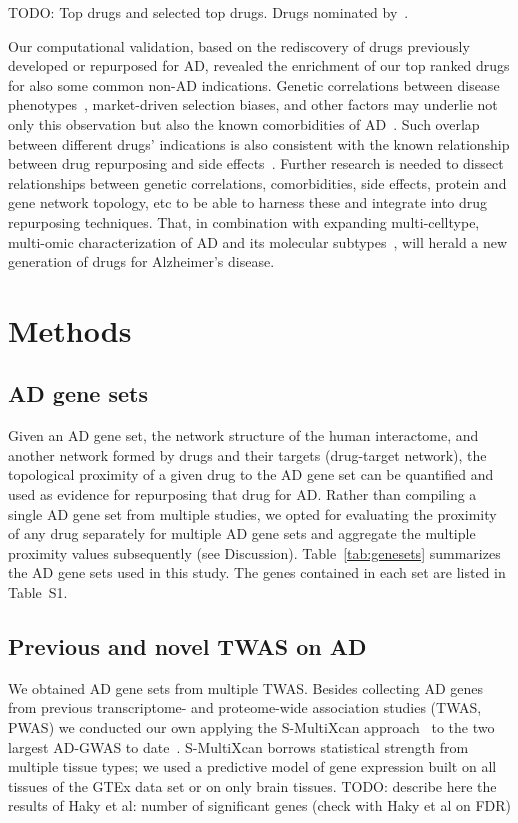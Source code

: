 \documentclass[letterpaper]{article}
\begin{document}
TODO: Top drugs and selected top drugs.  Drugs nominated
by~\cite{Fang2021,Taubes2021}.

Our computational validation, based on the rediscovery of drugs previously
developed or repurposed for AD, revealed the enrichment of our top ranked
drugs for also some common non-AD indications.  Genetic correlations between
disease phenotypes~\citep{Consortium2018}, market-driven selection biases, and
other factors may underlie not only this observation but also the known
comorbidities of AD~\citep{Santiago2021}.  Such overlap between different
drugs' indications is also consistent with the known relationship between drug
repurposing and side effects~\citep{Ye2014}.  Further research is needed to
dissect relationships between genetic correlations, comorbidities, side
effects, protein and gene network topology, etc to be able to harness these and
integrate into drug repurposing techniques.  That, in combination with
expanding multi-celltype, multi-omic characterization of AD and its molecular
subtypes~\citep{Neff2021}, will herald a new generation of drugs for
Alzheimer's disease.



\section{Methods}

\subsection{AD gene sets}

Given an AD gene set, the network structure of the human interactome, and
another network formed by drugs and their targets (drug-target network), the
topological proximity of a given drug to the AD gene set can be
quantified\citep{Guney2016} and used as evidence for repurposing that drug for
AD.  Rather than compiling a single AD gene set from multiple studies, we
opted for evaluating the proximity of any drug separately for multiple AD gene
sets and aggregate the multiple proximity values subsequently (see
Discussion).  Table~\ref{tab:genesets} summarizes the AD gene sets used in
this study.  The genes contained in each set are listed in Table~S1.

\subsection{Previous and novel TWAS on AD}

We obtained AD gene sets from multiple TWAS.  Besides collecting
AD genes from previous transcriptome- and proteome-wide association studies
(TWAS, PWAS) we
conducted our own applying the S-MultiXcan approach~\citep{Barbeira2018} to
the two largest AD-GWAS to date~\citep{Schwartzentruber2021,Wightman2021}.
S-MultiXcan borrows statistical strength from multiple tissue types; we used a
predictive model of gene expression built on all tissues of the GTEx data set
or on only brain tissues.
TODO: describe here the results of Haky et al:
number of significant genes (check with Haky et al on FDR)
\end{document}
